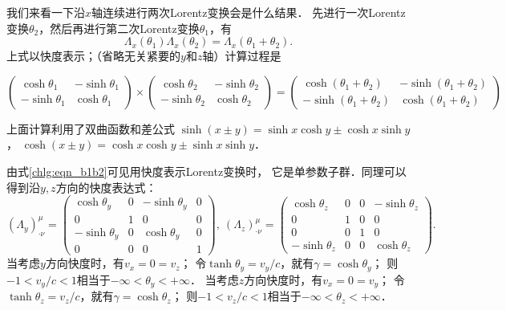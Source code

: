 我们来看一下沿$x$轴连续进行两次Lorentz变换会是什么结果．
先进行一次Lorentz变换$\theta_2$，然后再进行第二次Lorentz变换$\theta_1$，有
\begin{equation}\label{chlg:eqn_b1b2}
    \Lambda_x(\theta_1) \Lambda_x(\theta_2) = \Lambda_x(\theta_1+\theta_2).
\end{equation}
上式以快度表示；（省略无关紧要的$y$和$z$轴）计算过程是
\begin{small}
\[\begin{pmatrix}
    \cosh\theta_1  & -\sinh\theta_1 \\
    -\sinh\theta_1 & \cosh\theta_1  
\end{pmatrix} \times
\begin{pmatrix}
    \cosh\theta_2  & -\sinh\theta_2  \\
    -\sinh\theta_2 & \cosh\theta_2   
\end{pmatrix} = 
\begin{pmatrix}
    \cosh(\theta_1+\theta_2)  & -\sinh(\theta_1+\theta_2)  \\
    -\sinh(\theta_1+\theta_2) & \cosh(\theta_1+\theta_2) 
\end{pmatrix} \]
\end{small}
上面计算利用了双曲函数和差公式
$\sinh(x \pm y) = \sinh x \cosh y \pm  \cosh x \sinh y$，
$\cosh(x \pm y) = \cosh x \cosh y \pm  \sinh x \sinh y$．

由式\eqref{chlg:eqn_b1b2}可见用快度表示Lorentz变换时，
它是单参数子群．同理可以得到沿$y,z$方向的快度表达式：
\begin{equation*}  %
    (\Lambda_y)^{\mu}_{\cdot \nu} = 
    \begin{pmatrix}
        \cosh\theta_y  & 0 & -\sinh\theta_y & 0 \\
        0 & 1  & 0 & 0 \\
        -\sinh\theta_y & 0 & \cosh\theta_y & 0 \\
        0 & 0 & 0 & 1 
    \end{pmatrix},\
    (\Lambda_z)^{\mu}_{\cdot \nu} = 
    \begin{pmatrix}
        \cosh\theta_z  & 0 & 0 & -\sinh\theta_z \\
        0 & 1  & 0 & 0 \\
        0 & 0 & 1 & 0 \\
        -\sinh\theta_z & 0 & 0 & \cosh\theta_z
    \end{pmatrix} .
\end{equation*}
当考虑$y$方向快度时，有$v_x=0=v_z$；
令$\tanh \theta_y=v_y/c$，就有$\gamma = \cosh \theta_y$；
则$-1<v_y/c<1$相当于$-\infty < \theta_y <+\infty$．
当考虑$z$方向快度时，有$v_x=0=v_y$；
令$\tanh \theta_z=v_z/c$，就有$\gamma = \cosh \theta_z$；
则$-1<v_z/c<1$相当于$-\infty < \theta_z <+\infty$．





